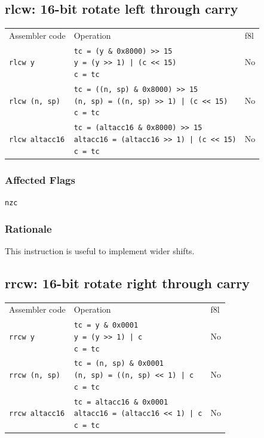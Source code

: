 \documentclass{book}
\begin{document}
\subsection{rlcw: 16-bit rotate left through carry}

\begin{tabular}{l l l}
Assembler code         & Operation                                                                                                             & f8l \\
\texttt{rlcw y}        & \makecell{\texttt{tc = (y \& 0x8000) >> 15}\\\texttt{y = (y >> 1) | (c << 15)}\\\texttt{c = tc}}                      & No \\
\texttt{rlcw (n, sp)}  & \makecell{\texttt{tc = ((n, sp) \& 0x8000) >> 15}\\\texttt{(n, sp) = ((n, sp) >> 1) | (c << 15)}\\\texttt{c = tc}}    & No \\
\texttt{rlcw altacc16} & \makecell{\texttt{tc = (altacc16 \& 0x8000) >> 15}\\\texttt{altacc16 = (altacc16 >> 1) | (c << 15)}\\\texttt{c = tc}} & No
\end{tabular}

\subsubsection*{Affected Flags}

\texttt{nzc}

\subsubsection*{Rationale}

This instruction is useful to implement wider shifts.


\subsection{rrcw: 16-bit rotate right through carry}

\begin{tabular}{l l l}
Assembler code         & Operation                                                                                              & f8l \\
\texttt{rrcw y}        & \makecell{\texttt{tc = y \& 0x0001}\\\texttt{y = (y >> 1) | c}\\\texttt{c = tc}}                      & No \\
\texttt{rrcw (n, sp)}  & \makecell{\texttt{tc = (n, sp) \& 0x0001}\\\texttt{(n, sp) = ((n, sp) << 1) | c}\\\texttt{c = tc}}    & No \\
\texttt{rrcw altacc16} & \makecell{\texttt{tc = altacc16 \& 0x0001}\\\texttt{altacc16 = (altacc16 << 1) | c}\\\texttt{c = tc}} & No
\end{tabular}
\end{document}
